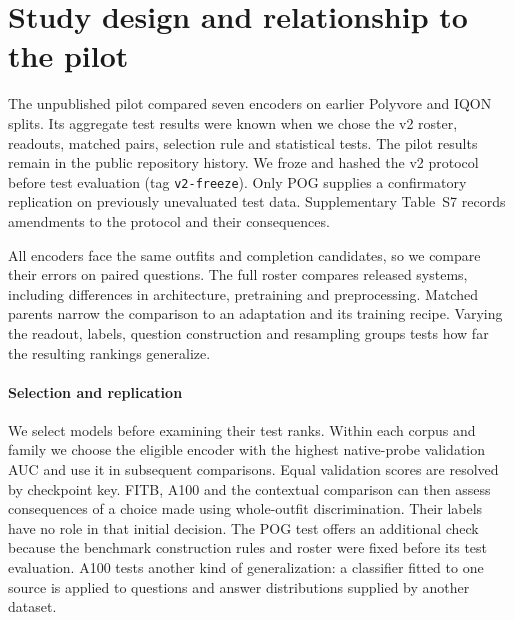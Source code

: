 \section{Study design and relationship to the pilot}
The unpublished pilot compared seven encoders on earlier Polyvore and IQON splits. Its aggregate test results were known when we chose the v2 roster, readouts, matched pairs, selection rule and statistical tests. The pilot results remain in the public repository history. We froze and hashed the v2 protocol before test evaluation (tag \texttt{v2-freeze}). Only POG supplies a confirmatory replication on previously unevaluated test data. Supplementary Table~S7 records amendments to the protocol and their consequences.

All encoders face the same outfits and completion candidates, so we compare their errors on paired questions. The full roster compares released systems, including differences in architecture, pretraining and preprocessing. Matched parents narrow the comparison to an adaptation and its training recipe. Varying the readout, labels, question construction and resampling groups tests how far the resulting rankings generalize.

\paragraph{Selection and replication}
We select models before examining their test ranks. Within each corpus and family we choose the eligible encoder with the highest native-probe validation AUC and use it in subsequent comparisons. Equal validation scores are resolved by checkpoint key. FITB, A100 and the contextual comparison can then assess consequences of a choice made using whole-outfit discrimination. Their labels have no role in that initial decision. The POG test offers an additional check because the benchmark construction rules and roster were fixed before its test evaluation. A100 tests another kind of generalization: a classifier fitted to one source is applied to questions and answer distributions supplied by another dataset.
